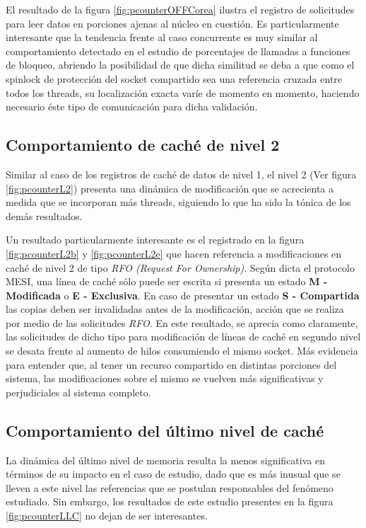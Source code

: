El resultado de la figura \ref{fig:pcounterOFFCorea} ilustra el registro de solicitudes para leer datos en porciones ajenas al núcleo en cuestión. Es particularmente interesante que la tendencia frente al caso concurrente es muy similar al comportamiento detectado en el estudio de porcentajes de llamadas a funciones de bloqueo, abriendo la posibilidad de que dicha similitud se deba a que como el spinlock de protección del socket compartido sea una referencia cruzada entre todos los threads, su localización exacta varíe de momento en momento, haciendo necesario éste tipo de comunicación para dicha validación.

\subsection{Comportamiento de caché de nivel 2}
Similar al caso de los registros de caché de datos de nivel 1, el nivel 2 (Ver figura \ref{fig:pcounterL2}) presenta una dinámica de modificación que se acrecienta a medida que se incorporan más threads, siguiendo lo que ha sido la tónica de los demás resultados.

Un resultado particularmente interesante es el registrado en la figura \ref{fig:pcounterL2b} y \ref{fig:pcounterL2e} que hacen referencia a modificaciones en caché de nivel 2 de tipo \emph{RFO (Request For Ownership)}. Según dicta el protocolo MESI, una línea de caché sólo puede ser escrita si presenta un estado \textbf{M - Modificada} o \textbf{E - Exclusiva}. En caso de presentar un estado \textbf{S - Compartida} las copias deben ser invalidadas antes de la modificación, acción que se realiza por medio de las solicitudes \emph{RFO}. En este resultado, se aprecia como claramente, las solicitudes de dicho tipo para modificación de líneas de caché en segundo nivel se desata frente al aumento de hilos consumiendo el mismo socket. Más evidencia para entender que, al tener un recurso compartido en distintas porciones del sistema, las modificaciones sobre el mismo se vuelven más significativas y perjudiciales al sistema completo.

\subsection{Comportamiento del último nivel de caché}
La dinámica del último nivel de memoria resulta la menos significativa en términos de su impacto en el caso de estudio, dado que es más inusual que se lleven a este nivel las referencias que se postulan responsables del fenómeno estudiado. Sin embargo, los resultados de este estudio presentes en la figura \ref{fig:pcounterLLC} no dejan de ser interesantes.

